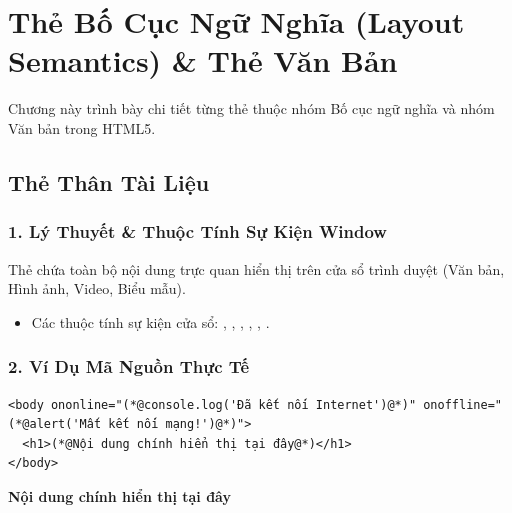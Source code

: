 \chapter{Thẻ Bố Cục Ngữ Nghĩa (Layout Semantics) \& Thẻ Văn Bản}
\label{chap:semantic_structure}

Chương này trình bày chi tiết từng thẻ thuộc nhóm Bố cục ngữ nghĩa và nhóm Văn bản trong HTML5.

\section{Thẻ Thân Tài Liệu }
\subsection{1. Lý Thuyết \& Thuộc Tính Sự Kiện Window}
Thẻ  chứa toàn bộ nội dung trực quan hiển thị trên cửa sổ trình duyệt (Văn bản, Hình ảnh, Video, Biểu mẫu).

\begin{itemize}
    \item Các thuộc tính sự kiện cửa sổ: , , , , , .
\end{itemize}

\subsection{2. Ví Dụ Mã Nguồn Thực Tế}
\begin{codeWindow}
\begin{lstlisting}[language=HTML5]
<body ononline="(*@console.log('Đã kết nối Internet')@*)" onoffline="(*@alert('Mất kết nối mạng!')@*)">
  <h1>(*@Nội dung chính hiển thị tại đây@*)</h1>
</body>
\end{lstlisting}
\end{codeWindow}

\begin{browserWindow}
\sffamily
{\Huge\bfseries Nội dung chính hiển thị tại đây}
\end{browserWindow}

